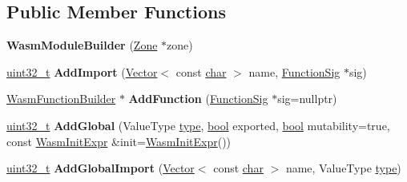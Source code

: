 \subsection*{Public Member Functions}
\begin{DoxyCompactItemize}
\item 
\mbox{\label{classv8_1_1internal_1_1wasm_1_1WasmModuleBuilder_a1ed9372caba8893eb4fda26de20c8722}} 
{\bfseries Wasm\+Module\+Builder} (\mbox{\hyperlink{classv8_1_1internal_1_1Zone}{Zone}} $\ast$zone)
\item 
\mbox{\label{classv8_1_1internal_1_1wasm_1_1WasmModuleBuilder_a080ad497a73a377c53c7bd6980bbfedf}} 
\mbox{\hyperlink{classuint32__t}{uint32\+\_\+t}} {\bfseries Add\+Import} (\mbox{\hyperlink{classv8_1_1internal_1_1Vector}{Vector}}$<$ const \mbox{\hyperlink{classchar}{char}} $>$ name, \mbox{\hyperlink{classv8_1_1internal_1_1Signature}{Function\+Sig}} $\ast$sig)
\item 
\mbox{\label{classv8_1_1internal_1_1wasm_1_1WasmModuleBuilder_a29e887529b67f35efab9090fa61b0e2b}} 
\mbox{\hyperlink{classv8_1_1internal_1_1wasm_1_1WasmFunctionBuilder}{Wasm\+Function\+Builder}} $\ast$ {\bfseries Add\+Function} (\mbox{\hyperlink{classv8_1_1internal_1_1Signature}{Function\+Sig}} $\ast$sig=nullptr)
\item 
\mbox{\label{classv8_1_1internal_1_1wasm_1_1WasmModuleBuilder_a7c2d9c29e1aaaf1020aa6fc091fda66c}} 
\mbox{\hyperlink{classuint32__t}{uint32\+\_\+t}} {\bfseries Add\+Global} (Value\+Type \mbox{\hyperlink{classstd_1_1conditional_1_1type}{type}}, \mbox{\hyperlink{classbool}{bool}} exported, \mbox{\hyperlink{classbool}{bool}} mutability=true, const \mbox{\hyperlink{structv8_1_1internal_1_1wasm_1_1WasmInitExpr}{Wasm\+Init\+Expr}} \&init=\mbox{\hyperlink{structv8_1_1internal_1_1wasm_1_1WasmInitExpr}{Wasm\+Init\+Expr}}())
\item 
\mbox{\label{classv8_1_1internal_1_1wasm_1_1WasmModuleBuilder_aa4753c545446dccacf184abd8110b9a3}} 
\mbox{\hyperlink{classuint32__t}{uint32\+\_\+t}} {\bfseries Add\+Global\+Import} (\mbox{\hyperlink{classv8_1_1internal_1_1Vector}{Vector}}$<$ const \mbox{\hyperlink{classchar}{char}} $>$ name, Value\+Type \mbox{\hyperlink{classstd_1_1conditional_1_1type}{type}})

\end{DoxyCompactItemize}
